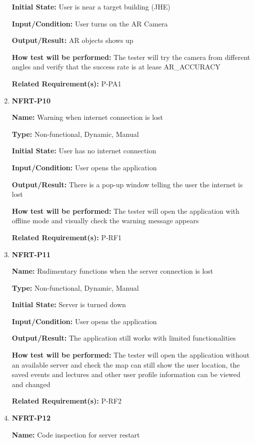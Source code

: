 \documentclass[12pt, titlepage]{article}
\begin{document}
\begin{enumerate}
\textbf{Initial State:} User is near a target building (JHE)
					
\textbf{Input/Condition:} User turns on the AR Camera
					
\textbf{Output/Result:} AR objects shows up

\textbf{How test will be performed:} The tester will try the camera from different angles and verify that the success rate is at lease AR\_ACCURACY

\textbf{Related Requirement(s):} P-PA1

\item{\textbf{NFRT-P10}}

\textbf{Name:} Warning when internet connection is lost

\textbf{Type:} Non-functional, Dynamic, Manual
					
\textbf{Initial State:} User has no internet connection
					
\textbf{Input/Condition:} User opens the application
					
\textbf{Output/Result:} There is a pop-up window telling the user the internet is lost

\textbf{How test will be performed:} The tester will open the application with offline mode and visually check the warning message appears

\textbf{Related Requirement(s):} P-RF1

\item{\textbf{NFRT-P11}}

\textbf{Name:} Rudimentary functions when the server connection is lost

\textbf{Type:} Non-functional, Dynamic, Manual
					
\textbf{Initial State:} Server is turned down
					
\textbf{Input/Condition:} User opens the application
					
\textbf{Output/Result:} The application still works with limited functionalities

\textbf{How test will be performed:} The tester will open the application without an available server and check the map can still show the user location, the saved events and lectures and other user profile information can be viewed and changed

\textbf{Related Requirement(s):} P-RF2

\item{\textbf{NFRT-P12}}

\textbf{Name:} Code inspection for server restart


\end{enumerate}
\end{document}
